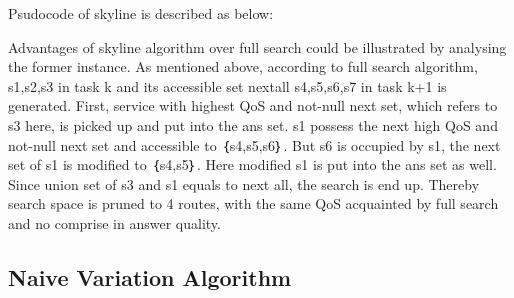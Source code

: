 \documentclass[senior,final,11pt]{iscs-thesis}
\begin{document}

Psudocode of skyline is described as below: 



Advantages of skyline algorithm over full search could be illustrated by analysing the former instance. As mentioned above, according to full search algorithm, {s1,s2,s3} in task k and its accessible set nextall {s4,s5,s6,s7} in task k+1 is generated. First, service with highest QoS and not-null next set, which refers to s3 here, is picked up and put into the ans set. s1 possess the next high QoS and not-null next set and accessible to ｛s4,s5,s6｝. But s6 is occupied by s1, the next set of s1 is modified to ｛s4,s5｝. Here modified s1 is put into the ans set as well. Since union set of s3 and s1 equals to next all, the search is end up. Thereby search space is pruned to 4 routes, with the same QoS acquainted by full search and no comprise in answer quality. 

\subsection{Naive Variation Algorithm}%
 
\end{document}
